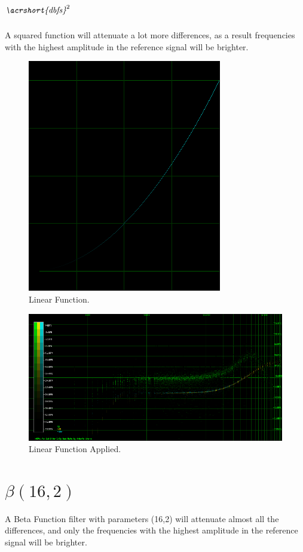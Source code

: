 \documentclass[10pt,a4paper]{report}
\newcommand{\squaredb}{$\textit{\acrshort{dbfs}}^2$}
\begin{document}
\begin{appendices}
\section{\squaredb{}}

A squared function will attenuate a lot more differences, as a result frequencies with the highest amplitude in the reference signal will be brighter.

\begin{figure}[H]
	\centering
	\includegraphics[width=0.4\linewidth]{images/colorfilter/BetaFunctionPlot_4.png}
	\caption[Linear]{Linear Function.}
	\label{fig:betafunctionplot4}
\end{figure}

\begin{figure}[H]
	\centering
	\includegraphics[width=1\linewidth]{images/colorfilter/BetaFunctionPlot_4_Data.png}
	\caption[Linear Applied]{Linear Function Applied.}
	\label{fig:betafunctionplot4data}
\end{figure}

\section{$\beta(16,2)$} 

A Beta Function filter with parameters (16,2) will attenuate almost all the differences, and only the frequencies with the highest amplitude in the reference signal will be brighter.


\end{appendices}
\end{document}
